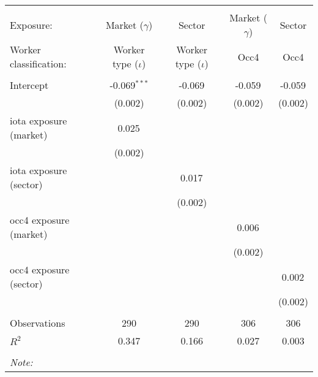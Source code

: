 \begin{tabular}{@{\extracolsep{5pt}}lcccc}
\\[-1.8ex]\hline
\hline \\[-1.8ex]
\hline \\[-1.8ex]
 Exposure: & Market ($\gamma$) & Sector & Market ($\gamma$) & Sector \\
 Worker classification: & Worker type ($\iota$) & Worker type ($\iota$) & Occ4 & Occ4 \\
 \hline &  &  &  &  \\
 Intercept & -0.069$^{***}$ & -0.069$^{}$ & -0.059$^{}$ & -0.059$^{}$ \\
  & (0.002) & (0.002) & (0.002) & (0.002) \\
 iota exposure (market) & 0.025$^{}$ & & & \\
  & (0.002) & & & \\
 iota exposure (sector) & & 0.017$^{}$ & & \\
  & & (0.002) & & \\
 occ4 exposure (market) & & & 0.006$^{}$ & \\
  & & & (0.002) & \\
 occ4 exposure (sector) & & & & 0.002$^{}$ \\
  & & & & (0.002) \\
\hline \\[-1.8ex]
 Observations & 290 & 290 & 306 & 306 \\
 $R^2$ & 0.347 & 0.166 & 0.027 & 0.003 \\
\hline
\hline \\[-1.8ex]
\textit{Note:}\end{tabular}